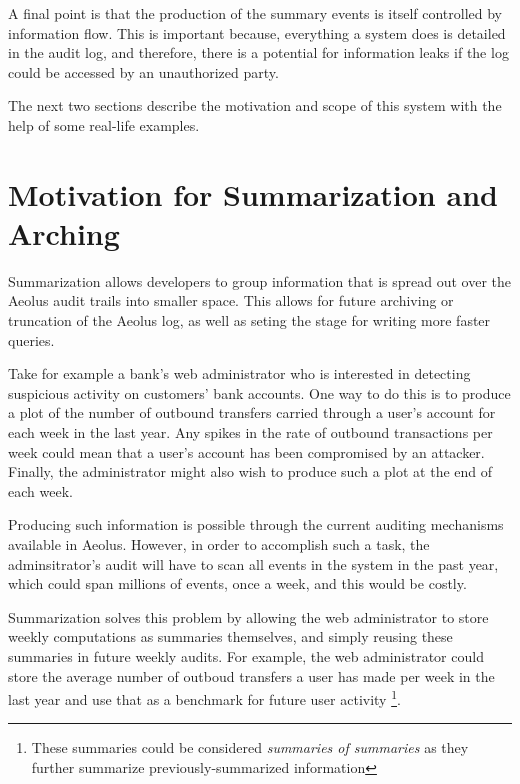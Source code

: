 A final point is that the production of the summary events is itself controlled by information flow.  This is important because, everything a system does is detailed in the audit log, and therefore, there is a potential for information leaks if the log could be accessed by an unauthorized party.

The next two sections describe the motivation and scope of this system with the help of some real-life examples.

\section{Motivation for Summarization and Arching}

Summarization allows developers to group information that is spread out over the Aeolus audit trails into smaller space. This allows for future archiving or truncation of the Aeolus log, as well as seting the stage for writing more faster queries.

Take for example a bank's web administrator who is interested in detecting suspicious activity on customers' bank accounts. One way to do this is to produce a plot of the number of outbound transfers carried through a user's account for each week in the last year. Any spikes in the rate of outbound transactions per week could mean that a user's account has been compromised by an attacker. Finally, the administrator might also wish to produce such a plot at the end of each week.

Producing such information is possible through the current auditing mechanisms available in Aeolus. However, in order to accomplish such a task, the adminsitrator's audit will have to scan all events in the system in the past year, which could span millions of events, once a week, and this would be costly.

Summarization solves this problem by allowing the web administrator to store weekly computations as summaries themselves, and simply reusing these summaries in future weekly audits. For example, the web administrator could store the average number of outboud transfers a user has made per week in the last year and use that as a benchmark for future user activity
\footnote{These summaries could be considered \emph{summaries of summaries} as they further summarize previously-summarized information}.

